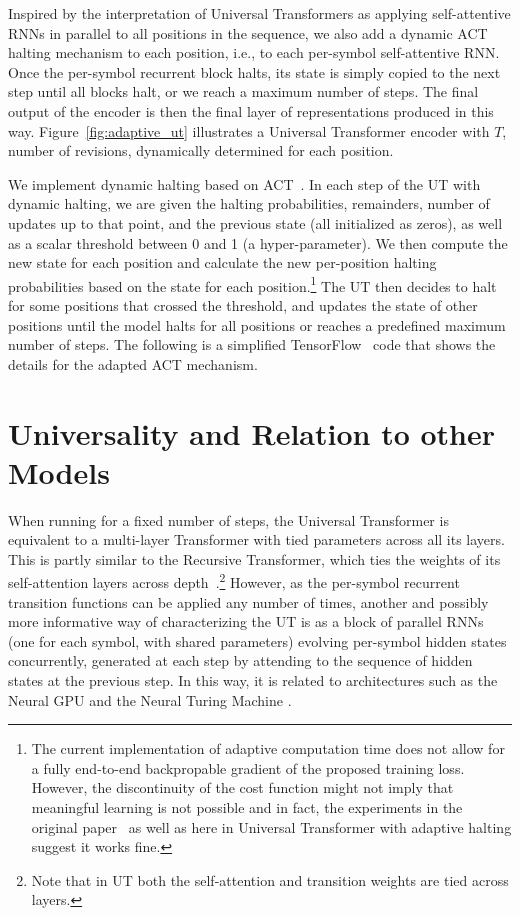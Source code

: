 Inspired by the interpretation of Universal Transformers as applying self-attentive RNNs in parallel to all positions in the sequence, we also add a dynamic ACT halting mechanism to each position, i.e., to each per-symbol self-attentive RNN. Once the per-symbol recurrent block halts, its state is simply copied to the next step until all blocks halt, or we reach a maximum number of steps. The final output of the encoder is then the final layer of representations produced in this way. Figure~\ref{fig:adaptive_ut} illustrates a Universal Transformer encoder with $T$, number of revisions, dynamically determined for each position.


We implement dynamic halting based on ACT~\citep{graves2016adaptive}. In each step of the UT with dynamic halting, we are given the halting probabilities, remainders, number of updates up to that point, and the previous state (all initialized as zeros), as well as a scalar threshold between 0 and 1 (a hyper-parameter). We then compute the new state for each position and calculate the new per-position halting probabilities based on the state for each position.\footnote{The current implementation of adaptive computation time does not allow for a fully end-to-end backpropable gradient of the proposed training loss. However, the discontinuity of the cost function might not imply that meaningful learning is not possible and in fact, the experiments in the original paper~\citep{graves2016adaptive} as well as here in Universal Transformer with adaptive halting suggest it works fine.} The UT then decides to halt for some positions that crossed the threshold, and updates the state of other positions until the model halts for all positions or reaches a predefined maximum number of steps. 
The following is a simplified TensorFlow~\citep{tensorflow2015-whitepaper} code that shows the details for the adapted ACT mechanism.



\section{Universality and Relation to other Models}
\label{sec:related}
When running for a fixed number of steps, the Universal Transformer is equivalent to a multi-layer Transformer with tied parameters across all its layers. This is partly similar to the Recursive Transformer, which ties the weights of its self-attention layers across depth~\citep{gulcehre2018hyperbolic}.\footnote{Note that in UT both the self-attention and transition weights are tied across layers.} However, as the per-symbol recurrent transition functions can be applied any number of times, another and possibly more informative way of characterizing the UT is as a block of parallel RNNs (one for each symbol, with shared parameters) evolving per-symbol hidden states concurrently, generated at each step by attending to the sequence of hidden states at the previous step. In this way, it is related to architectures such as the Neural GPU \citep{neural_gpu} and the Neural Turing Machine \citep{ntm14}. 

